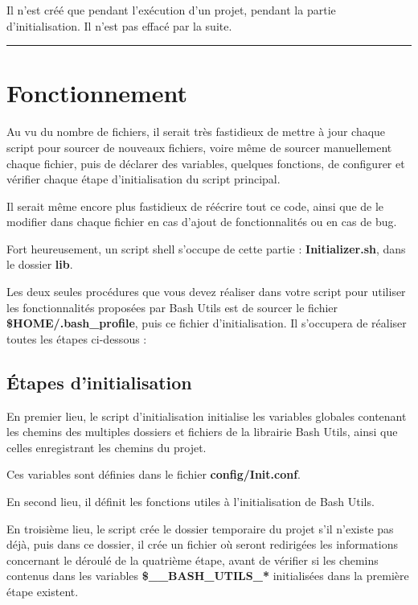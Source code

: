 \documentclass[a4paper,10pt]{article}
\begin{document}
Il n'est créé que pendant l'exécution d'un projet, pendant la partie d'initialisation. Il n'est pas effacé par la suite.\\[1\baselineskip]


\color{red}\par\noindent\rule{\textwidth}{0.4pt}\color{white}

\color{red}
\section{Fonctionnement}\color{white}
Au vu du nombre de fichiers, il serait très fastidieux de mettre à jour chaque script pour sourcer de nouveaux fichiers, voire même de sourcer manuellement chaque fichier, puis de déclarer des variables, quelques fonctions, de configurer et vérifier chaque étape d'initialisation du script principal.

Il serait même encore plus fastidieux de réécrire tout ce code, ainsi que de le modifier dans chaque fichier en cas d'ajout de fonctionnalités ou en cas de bug.

Fort heureusement, un script shell s'occupe de cette partie : \color{lime}\textbf{Initializer.sh}\color{white}, dans le dossier \color{lime}\textbf{lib}\color{white}.

Les deux seules procédures que vous devez réaliser dans votre script pour utiliser les fonctionnalités proposées par Bash Utils est de sourcer le fichier \color{orange}\textbf{\$HOME\color{lime}/.bash\_profile}\color{white}, puis ce fichier d'initialisation. Il s'occupera de réaliser toutes les étapes ci-dessous :

\color{green}
\subsection{Étapes d'initialisation}\color{white}
En premier lieu, le script d'initialisation initialise les variables globales contenant les chemins des multiples dossiers et fichiers de la librairie Bash Utils, ainsi que celles enregistrant les chemins du projet.

Ces variables sont définies dans le fichier \color{lime}\textbf{config/Init.conf}\color{white}.

En second lieu, il définit les fonctions utiles à l'initialisation de Bash Utils.

En troisième lieu, le script crée le dossier temporaire du projet s'il n'existe pas déjà, puis dans ce dossier, il crée un fichier où seront redirigées les informations concernant le déroulé de la quatrième étape, avant de vérifier si les chemins contenus dans les variables \color{orange}\textbf{\$\_\_BASH\_UTILS\_*}\color{white} initialisées dans la première étape existent.
\end{document}
